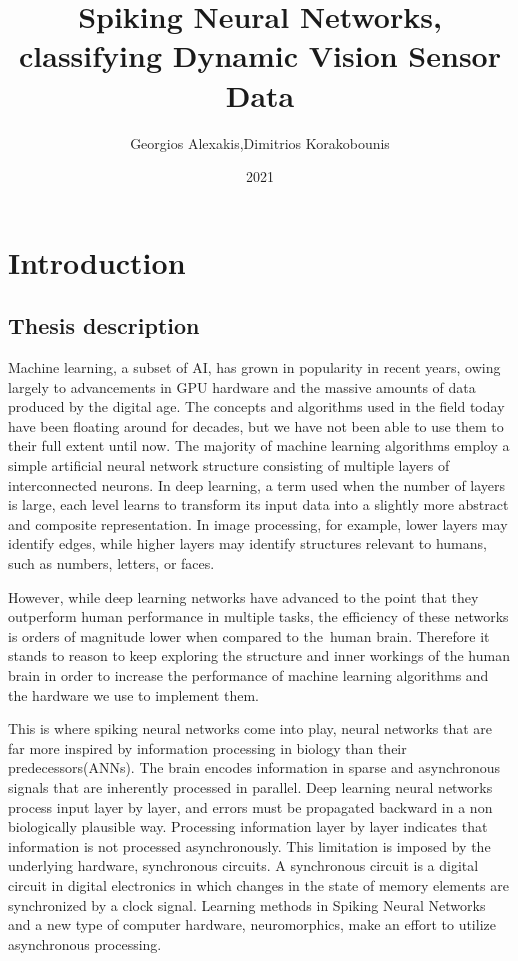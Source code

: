 \documentclass{report}
\title{Spiking Neural Networks, classifying Dynamic Vision Sensor Data }
\author{Georgios Alexakis,Dimitrios Korakobounis}
\date{2021}
\begin{document}
\maketitle

\tableofcontents{}
\chapter{Introduction}
     
\section{Thesis description}
Machine learning, a subset of AI, has grown in popularity in recent years, owing largely to advancements in GPU hardware and the massive amounts of data produced by the digital age. The concepts and algorithms used in the field today have been floating around for decades, but we have not been able to use them to their full extent until now. The majority of machine learning algorithms employ a simple artificial neural network structure consisting of multiple layers of interconnected neurons. In deep learning, a term used when the number of layers is large, each level learns to transform its input data into a slightly more abstract and composite representation. In image processing, for example, lower layers may identify edges, while higher layers may identify structures relevant to humans, such as numbers, letters, or faces.

However, while deep learning networks have advanced to the point that they outperform human performance in multiple tasks, the efficiency of these networks is orders of magnitude lower when compared to the human brain. Therefore it stands to reason to keep exploring the structure and inner workings of the human brain in order to increase the performance of machine learning algorithms and the hardware we use to implement them. 

This is where spiking neural networks come into play, neural networks that are far more inspired by information processing in biology than their predecessors(ANNs). The brain encodes information in sparse and asynchronous signals that are inherently processed in parallel. Deep learning neural networks process input layer by layer, and errors must be propagated backward in a non biologically plausible way. Processing information layer by layer indicates that information is not processed asynchronously. This limitation is imposed by the underlying hardware, synchronous circuits. A synchronous circuit is a digital circuit in digital electronics in which changes in the state of memory elements are synchronized by a clock signal. Learning methods in Spiking Neural Networks and a new type of computer hardware, neuromorphics, make an effort to utilize asynchronous processing.
\end{document}
